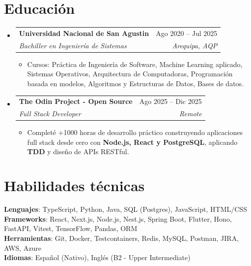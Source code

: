 \documentclass[letterpaper,11pt]{article}
\makeatletter
\newcommand{\resumeItem}[1]{
  \item\small{
    {#1 \vspace{-2pt}}
  }
}
\newcommand{\resumeSubheading}[4]{
  \vspace{-2pt}\item
    \begin{tabular*}{0.97\textwidth}[t]{l@{\extracolsep{\fill}}r}
      \textbf{#1} & #2 \\
      \textit{\small#3} & \textit{\small #4} \\
    \end{tabular*}\vspace{-7pt}
}
\newcommand{\resumeSubHeadingListStart}{\begin{itemize}[leftmargin=0.15in, label={}]}
\newcommand{\resumeSubHeadingListEnd}{\end{itemize}}
\newcommand{\resumeItemListStart}{\begin{itemize}}
\newcommand{\resumeItemListEnd}{\end{itemize}\vspace{-5pt}}
\makeatother
\begin{document}
\section{Educación}
  \resumeSubHeadingListStart
    \resumeSubheading
      {Universidad Nacional de San Agustin}{Ago 2020 -- Jul 2025}
      {Bachiller en Ingeniería de Sistemas}{Arequipa, AQP}
      \resumeItemListStart
        \resumeItem{Cursos: Práctica de Ingeniería de Software, Machine Learning aplicado, Sistemas Operativos, Arquitectura de Computadoras, Programación basada en modelos, Algoritmos y Estructuras de Datos, Bases de datos.}
      \resumeItemListEnd
    \resumeSubheading
      {The Odin Project - Open Source }{Ago 2025 -- Dic 2025}
      {Full Stack Developer}{Remote}
        \resumeItemListStart
            \resumeItem{Completé +1000 horas de desarrollo práctico construyendo aplicaciones full stack desde cero con \textbf{Node.js, React y PostgreSQL}, aplicando \textbf{TDD} y diseño de APIs RESTful.}
        \resumeItemListEnd
  \resumeSubHeadingListEnd


\section{Habilidades técnicas}
 \begin{itemize}[leftmargin=0.15in, label={}]
    \small{\item{
     \textbf{Lenguajes}{: TypeScript, Python, Java, SQL (Postgres), JavaScript, HTML/CSS} \\
     \textbf{Frameworks}{: React, Next.js, Node.js, Nest.js, Spring Boot, Flutter, Hono, FastAPI, Vitest, TensorFlow, Pandas, ORM} \\
     \textbf{Herramientas}{: Git, Docker, Testcontainers, Redis, MySQL, Postman, JIRA, AWS, Azure} \\
     \textbf{Idiomas}{: Español (Nativo), Inglés (B2 - Upper Intermediate)} \\
    }}
 \end{itemize}


\end{document}

